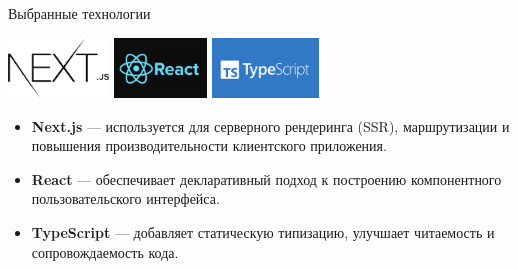 \documentclass[aspectratio=169]{beamer}
\begin{document}
\begin{frame}{Выбранные технологии}

\centering
\includegraphics[height=1.6cm]{static/nextjs-logo.png} \hspace{1cm}
\includegraphics[height=1.6cm]{static/react-logo.png} \hspace{1cm}
\includegraphics[height=1.6cm]{static/typescript-logo.png}

\vspace{1.5em}
\small
\begin{itemize}
  \item \textbf{Next.js} — используется для серверного рендеринга (SSR), маршрутизации и повышения производительности клиентского приложения.
  \item \textbf{React} — обеспечивает декларативный подход к построению компонентного пользовательского интерфейса.
  \item \textbf{TypeScript} — добавляет статическую типизацию, улучшает читаемость и сопровождаемость кода.
\end{itemize}
\end{frame}
\end{document}
